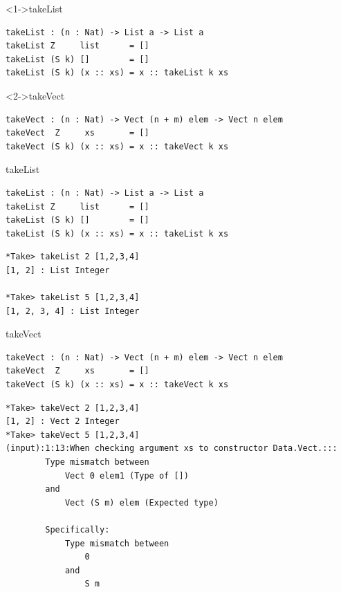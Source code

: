 \documentclass{beamer}
\begin{document}
\begin{frame}[fragile]{\dependentTypes}
	\begin{block}<1->{takeList}
		 \begin{lstlisting}[basicstyle=\ttfamily\scriptsize]
takeList : (n : Nat) -> List a -> List a
takeList Z     list      = []
takeList (S k) []        = []
takeList (S k) (x :: xs) = x :: takeList k xs
		\end{lstlisting}
	\end{block}
\begin{block}<2->{takeVect}
	\begin{lstlisting}[basicstyle=\ttfamily\scriptsize]
takeVect : (n : Nat) -> Vect (n + m) elem -> Vect n elem
takeVect  Z     xs       = []
takeVect (S k) (x :: xs) = x :: takeVect k xs
	\end{lstlisting}
\end{block}
\end{frame}
\begin{frame}[fragile]{\dependentTypes}
	\begin{block}{takeList}
		\begin{lstlisting}[basicstyle=\ttfamily\scriptsize]
takeList : (n : Nat) -> List a -> List a
takeList Z     list      = []
takeList (S k) []        = []
takeList (S k) (x :: xs) = x :: takeList k xs
		\end{lstlisting}
	\end{block}
\begin{block}{}
	\begin{lstlisting}[basicstyle=\ttfamily\scriptsize]
*Take> takeList 2 [1,2,3,4]
[1, 2] : List Integer

*Take> takeList 5 [1,2,3,4]
[1, 2, 3, 4] : List Integer
	\end{lstlisting}
\end{block}
\end{frame}

\begin{frame}[fragile]{\dependentTypes}
	\begin{block}{takeVect}
		\begin{lstlisting}[basicstyle=\ttfamily\scriptsize]
takeVect : (n : Nat) -> Vect (n + m) elem -> Vect n elem
takeVect  Z     xs       = []
takeVect (S k) (x :: xs) = x :: takeVect k xs
		\end{lstlisting}
	\end{block}
	\begin{block}{}
		\begin{lstlisting}[basicstyle=\ttfamily\scriptsize]
*Take> takeVect 2 [1,2,3,4]
[1, 2] : Vect 2 Integer
*Take> takeVect 5 [1,2,3,4]
(input):1:13:When checking argument xs to constructor Data.Vect.:::
		Type mismatch between
			Vect 0 elem1 (Type of [])
		and
			Vect (S m) elem (Expected type)
			
		Specifically:
			Type mismatch between
				0
			and
				S m
		\end{lstlisting}
	\end{block}
\end{frame}
\end{document}
